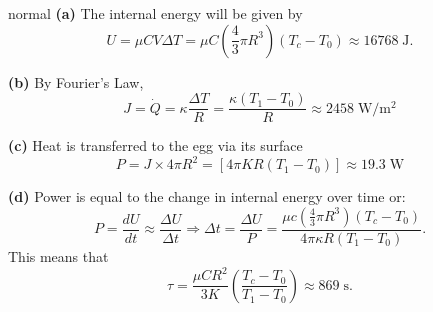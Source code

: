 \begin{solution}{normal}
\textbf{(a)} The internal energy will be given by 
\[U=\mu C V \Delta T=\mu C\left(\frac{4}{3} \pi R^{3}\right)\left(T_{c}-T_{0}\right) \approx 16768\;\mathrm{J}.\]
\vspace{3mm}

\noindent \textbf{(b)} By Fourier's Law,
$$J=\dot{Q}=\kappa\frac{\Delta T}{R}=\frac{\kappa \left(T_{1}-T_{0}\right)}{R} \approx 2458 \;\mathrm{W/m^2}
$$
\vspace{3mm}

\noindent \textbf{(c)} Heat is transferred to the egg via its surface
$$
P=J \times 4 \pi R^{2}=\left[4 \pi K R\left(T_{1}-T_{0}\right)\right] \approx 19.3 \;\mathrm{W}
$$
\vspace{3mm}

\noindent \textbf{(d)} Power is equal to the change in internal energy over time or:
\[P=\frac{d U}{d t} \approx \frac{\Delta U}{\Delta t} \Rightarrow \Delta t=\frac{\Delta U}{P}=\frac{\mu c\left(\frac{4}{3} \pi R^{3}\right)\left(T_{c}-T_{0}\right)}{4 \pi \kappa R\left(T_{1}-T_{0}\right)}.\]
This means that 
\[\tau=\frac{\mu C R^{2}}{3 K}\left(\frac{T_{c}-T_{0}}{T_{1}-T_{0}}\right) \approx 869\;\mathrm{s}.\]
\end{solution}